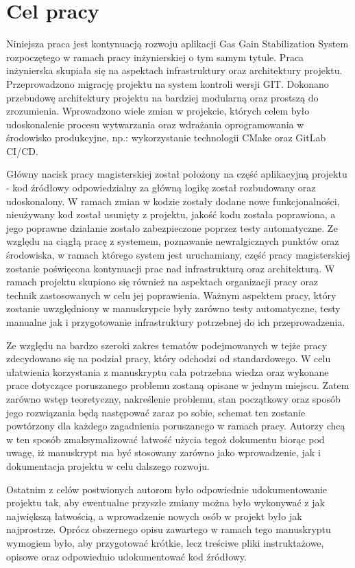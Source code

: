 \section{Cel pracy}


Niniejsza praca jest kontynuacją rozwoju aplikacji Gas Gain Stabilization System rozpoczętego w ramach pracy
inżynierskiej o tym samym tytule. Praca inżynierska skupiała się na aspektach infrastruktury oraz architektury projektu. Przeprowadzono migrację projektu na system kontroli wersji GIT. Dokonano przebudowę architektury projektu na bardziej modularną oraz prostszą do zrozumienia. Wprowadzono wiele zmian w projekcie, których celem było udoskonalenie procesu wytwarzania oraz wdrażania oprogramowania w środowisko produkcyjne, np.: wykorzystanie technologii CMake oraz GitLab CI/CD.


Główny nacisk pracy magisterskiej został położony na część aplikacyjną projektu - kod źródłowy odpowiedzialny za
główną logikę został rozbudowany oraz udoskonalony. W ramach zmian w kodzie zostały dodane nowe funkcjonalności,
nieużywany kod został usunięty z projektu, jakość kodu została poprawiona, a jego poprawne działanie zostało
zabezpieczone poprzez testy automatyczne. Ze względu na ciągłą pracę z systemem, poznawanie newralgicznych punktów oraz środowiska, w ramach którego system jest uruchamiany, część pracy magisterskiej zostanie poświęcona kontynuacji prac nad infrastrukturą oraz architekturą. W ramach projektu skupiono się również na aspektach organizacji pracy oraz technik zastosowanych w celu jej poprawienia. Ważnym aspektem pracy, który zostanie uwzględniony w manuskrypcie były zarówno testy automatyczne, testy manualne jak i przygotowanie infrastruktury potrzebnej do ich przeprowadzenia.


Ze względu na bardzo szeroki zakres tematów podejmowanych w tejże pracy zdecydowano się na podział pracy, który odchodzi od standardowego. W celu ułatwienia korzystania z manuskryptu cała potrzebna wiedza oraz wykonane prace dotyczące poruszanego problemu zostaną opisane w jednym miejscu. Zatem zarówno wstęp teoretyczny, nakreślenie problemu, stan początkowy oraz sposób jego rozwiązania będą następować zaraz po sobie, schemat ten zostanie powtórzony dla każdego zagadnienia poruszanego w ramach pracy. Autorzy chcą w ten sposób zmaksymalizować łatwość użycia tegoż dokumentu biorąc pod uwagę, iż manuskrypt ma być stosowany zarówno jako wprowadzenie, jak i dokumentacja projektu w celu dalszego rozwoju.


Ostatnim z celów postwionych autorom było odpowiednie udokumentowanie projektu tak, aby ewentualne przyszłe zmiany można było wykonywać z jak największą łatwością, a wprowadzenie nowych osób w projekt było jak najprostrze. Oprócz obszernego opisu zawartego w ramach tego manuskryptu wymogiem było, aby przygotować krótkie, lecz treściwe pliki instruktażowe, opisowe oraz odpowiednio udokumentować kod źródłowy.